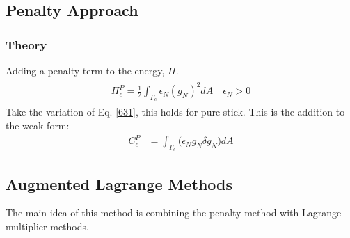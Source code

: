 \documentclass[12pt,3p]{article}
\numberwithin{equation}{section}
\begin{document}
\subsection{Penalty Approach}
\subsubsection{Theory}
Adding a penalty term to the energy, $\Pi$.
\begin{align}\label{631}
\begin{split}
\Pi_c^P = \frac{1}{2} \int_{\Gamma_c} \epsilon_N (g_{N})^2 dA \quad \epsilon_N > 0 
\end{split}
\end{align}
Take the variation of Eq. \ref{631}, this holds for pure stick. This is the addition to the weak form: 
\begin{align*}
C_c^P &= \int_{\Gamma_c} \big(\epsilon_N g_{N} \delta g_{N} \big) dA 
\end{align*}

\subsection{Augmented Lagrange Methods}
The main idea of this method is combining the penalty method with Lagrange multiplier methods. 
\end{document}
